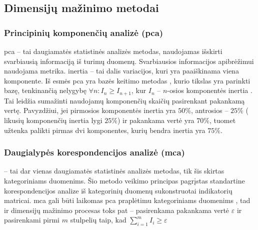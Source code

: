 \subsection{Dimensijų mažinimo metodai}

\subsubsection{Principinių komponenčių analizė (\gls{pca})}

\gls{pca} -- tai daugiamatės statistinės analizės metodas, naudojamas išskirti svarbiausią informaciją iš turimų duomenų. Svarbiausios informacijos apibrėžimui naudojama  metrika. \Gls{inertia} -- tai dalis variacijos, kuri yra paaiškinama viena komponente. Iš esmės \gls{pca} yra bazės keitimo metodas , kurio tikslas yra parinkti bazę, tenkinančią nelygybę $\forall n: I_n \ge I_{n+1}$, kur $I_n$ -- $n$-osios komponentės \gls{inertia} \cite{abdiPrincipalComponentAnalysis2010}. Tai leidžia sumažinti naudojamų komponenčių skaičių pasirenkant pakankamą  vertę. Pavyzdžiui, jei pirmosios komponentės \gls{inertia} yra $50\%$, antrosios -- $25\%$ (\rightarrow \; likusių komponenčių \gls{inertia} lygi $25\%$) ir pakankama  vertė yra $70\%$, tuomet užtenka palikti pirmas dvi komponentes, kurių bendra \gls{inertia}  yra $75\%$.

\subsubsection{Daugialypės korespondencijos analizė (\gls{mca})}

 -- tai dar vienas daugiamatės statistinės analizės metodas, tik šis skirtas kategoriniams duomenims. Šio metodo veikimo principas pagrįstas standartine korespondencijos analize  iš kategorinių duomenų sukonstruotai indikatorių matricai. \gls{mca} gali būti laikomas \gls{pca} praplėtimu kategoriniams duomenims \cite{abdiMultipleCorrespondenceAnalysis2007}, tad ir dimensijų mažinimo procesas toks pat -- pasirenkama pakankama  vertė $\varepsilon$ ir pasirenkami pirmi $m$ stulpelių taip, kad $\sum_{i=1}^m{I_i} \ge \varepsilon$

% 